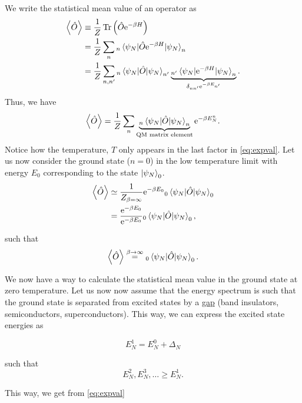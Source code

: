 We write the statistical mean value of an operator as
\begin{align}
\expval{\hat{O}} &\equiv \frac{1}{Z}\Tr\left(\hat{O}\mathrm{e}^{-\beta H}\right) \nonumber\\
&= \frac{1}{Z} \sum_n {}_n\mel{\psi_N}{\hat{O}\mathrm{e}^{-\beta H}}{\psi_N}_n \nonumber \\
&= \frac{1}{Z} \sum_{n, n'} {}_n\expval{\hat{O}}{\psi_N}_{n'}\underbrace{{}_{n'}\expval{\mathrm{e}^{-\beta H}}{\psi_N}_n}_{\delta_{nn'}\mathrm{e}^{-\beta E_{n'}}}.
\end{align}
Thus, we have 
\begin{equation}
\label{eq:expval}
\expval{\hat{O}} = \frac{1}{Z}\sum_n \underbrace{{}_n\expval{\hat{O}}{\psi_N}_n}_{\text{QM matrix element}}\mathrm{e}^{-\beta E_N^n}.
\end{equation}
Notice how the temperature, $T$ only appears in the last factor in \eqref{eq:expval}.
Let us now consider the ground state ($n = 0$) in the low temperature limit with energy $E_0$ corresponding to the state $\ket{\psi_N}_0$.
\begin{align*}
\expval{\hat{O}} &\simeq \frac{1}{Z_{\beta = \infty}}\mathrm{e}^{-\beta E_0} {}_0\expval{\hat{O}}{\psi_N}_0 \\
&= \frac{\mathrm{e}^{-\beta E_0}}{\mathrm{e}^{-\beta E_0}}{}_0\expval{\hat{O}}{\psi_N}_0, 
\end{align*}

such that 
\begin{equation}
\expval{\hat{O}} \stackrel{\beta \rightarrow \infty}{=} {}_0\expval{\hat{O}}{\psi_N}_0.
\end{equation}

We now have a way to calculate the statistical mean value in the ground state at zero temperature. Let us now now assume that the energy spectrum is such that the ground state is separated from excited states by a  \underline{gap} (band insulators, semiconductors, superconductors). This way, we can express the excited state energies as 

\begin{equation}
E_N^1 = E_N^0 + \Delta_N
\end{equation}

such that 
\begin{equation}
E_N^2, E_N^3, \dots \ge E_N^1. 
\end{equation}

This way, we get from \eqref{eq:expval}

